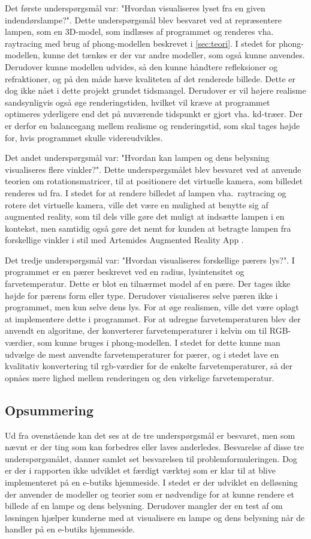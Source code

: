 Det første underspørgsmål var: "Hvordan visualiseres lyset fra en given indendørslampe?". Dette underspørgsmål blev besvaret ved at repræsentere lampen, som en 3D-model, som indlæses af programmet og renderes vha. raytracing med brug af phong-modellen beskrevet i \ref{sec:teori}. I stedet for phong-modellen, kunne det tænkes er der var andre modeller, som også kunne anvendes. Derudover kunne modellen udvides, så den kunne håndtere refleksioner og refraktioner, og på den måde hæve kvaliteten af det renderede billede. Dette er dog ikke nået i dette projekt grundet tidsmangel. Derudover er vil højere realisme sandsynligvis også øge renderingstiden, hvilket vil kræve at programmet optimeres yderligere end det på nuværende tidspunkt er gjort vha. kd-træer. Der er derfor en balancegang mellem realisme og renderingstid, som skal tages højde for, hvis programmet skulle videreudvikles.

Det andet underspørgsmål var: "Hvordan kan lampen og dens belysning visualiseres flere vinkler?". Dette underspørgsmålet blev besvaret ved at anvende teorien om rotationsmatricer, til at positionere det virtuelle kamera, som billedet renderes ud fra. I stedet for at rendere billedet af lampen vha.\ raytracing og rotere det virtuelle kamera, ville det være en mulighed at benytte sig af augmented reality, som til dels ville gøre det muligt at indsætte lampen i en kontekst, men samtidig også gøre det nemt for kunden at betragte lampen fra forskellige vinkler i stil med Artemides Augmented Reality App \cite{artemides}. 

Det tredje underspørgsmål var: "Hvordan visualiseres forskellige pærers lys?". I programmet er en pærer beskrevet ved en radius, lysintensitet og farvetemperatur. Dette er blot en tilnærmet model af en pære. Der tages ikke højde for pærens form eller type. Derudover visualiseres selve pæren ikke i programmet, men kun selve dens lys. For at øge realismen, ville det være oplagt at implementere dette i programmet. 
For at udregne farvetemperaturen blev der anvendt en algoritme, der konverterer farvetemperaturer i kelvin om til RGB-værdier, som kunne bruges i phong-modellen. I stedet for dette kunne man udvælge de mest anvendte farvetemperaturer for pærer, og i stedet lave en kvalitativ konvertering til rgb-værdier for de enkelte farvetemperaturer, så der opnåes mere lighed mellem renderingen og den virkelige farvetemperatur.

\subsection*{Opsummering}
Ud fra ovenstående kan det ses at de tre underspørgsmål er besvaret, men som nævnt er der ting som kan forbedres eller laves anderledes. Besvarelse af disse tre underspørgsmålet, danner samlet set besvarelsen til problemformuleringen. Dog er der i rapporten ikke udviklet et færdigt værktøj som er klar til at blive implementeret på en e-butiks hjemmeside. I stedet er der udviklet en delløsning der anvender de modeller og teorier som er nødvendige for at kunne rendere et billede af en lampe og dens belysning. Derudover mangler der en test af om løsningen hjælper kunderne med at visualisere en lampe og dens belysning når de handler på en e-butiks hjemmeside. 


